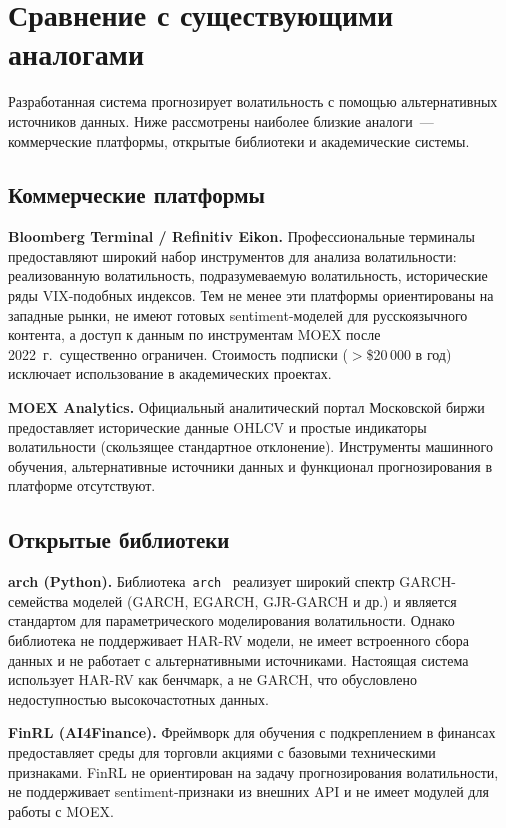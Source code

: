 \section{Сравнение с существующими аналогами}

Разработанная система прогнозирует волатильность с помощью альтернативных
источников данных. Ниже рассмотрены наиболее близкие аналоги~---
коммерческие платформы, открытые библиотеки и академические системы.

\subsection{Коммерческие платформы}

\textbf{Bloomberg Terminal / Refinitiv Eikon.}
Профессиональные терминалы предоставляют широкий набор инструментов
для анализа волатильности: реализованную волатильность, подразумеваемую волатильность,
исторические ряды VIX-подобных индексов.
Тем не менее эти платформы ориентированы на западные рынки,
не имеют готовых sentiment-моделей для русскоязычного контента,
а доступ к данным по инструментам MOEX после 2022~г.\ существенно ограничен.
Стоимость подписки ($>$\$20\,000 в год) исключает использование в академических проектах.

\textbf{MOEX Analytics.}
Официальный аналитический портал Московской биржи предоставляет
исторические данные OHLCV и простые индикаторы волатильности
(скользящее стандартное отклонение).
Инструменты машинного обучения, альтернативные источники данных
и функционал прогнозирования в платформе отсутствуют.

\subsection{Открытые библиотеки}

\textbf{arch (Python).}
Библиотека~\texttt{arch}~\cite{Sheppard2017} реализует широкий спектр
GARCH-семейства моделей (GARCH, EGARCH, GJR-GARCH и др.)
и является стандартом для параметрического моделирования волатильности.
Однако библиотека не поддерживает HAR-RV модели, не имеет встроенного
сбора данных и не работает с альтернативными источниками.
Настоящая система использует HAR-RV как бенчмарк,
а не GARCH, что обусловлено недоступностью высокочастотных данных.

\textbf{FinRL (AI4Finance).}
Фреймворк для обучения с подкреплением в финансах~\cite{Liu2021}
предоставляет среды для торговли акциями с базовыми техническими признаками.
FinRL не ориентирован на задачу прогнозирования волатильности,
не поддерживает sentiment-признаки из внешних API
и не имеет модулей для работы с MOEX.

